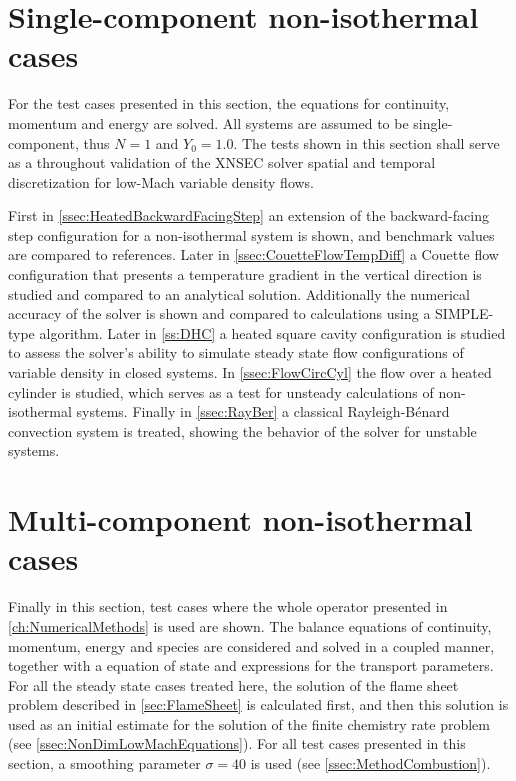 \section{Single-component non-isothermal cases} \label{sec:SinCompNonIsothermCase}
For the test cases presented in this section, the equations for continuity, momentum and energy are solved. All systems are assumed to be single-component, thus $N = 1$ and $Y_0 = 1.0$. 
The tests shown in this section shall serve as a throughout validation of the XNSEC solver spatial and temporal discretization for low-Mach variable density flows. 

First in \cref{ssec:HeatedBackwardFacingStep} an extension of the backward-facing step configuration for a non-isothermal system is shown, and benchmark values are compared to references. Later in \cref{ssec:CouetteFlowTempDiff} a Couette flow configuration that presents a temperature gradient in the vertical direction is studied and compared to an analytical solution. Additionally the numerical accuracy of the solver is shown and compared to calculations using a SIMPLE-type algorithm. Later in \cref{ss:DHC} a heated square cavity configuration is studied to assess the solver's ability to simulate steady state flow configurations of variable density in closed systems. In \cref{ssec:FlowCircCyl} the flow over a heated cylinder is studied, which serves as a test for unsteady calculations of non-isothermal systems. Finally in \cref{ssec:RayBer} a classical Rayleigh-Bénard convection system is treated, showing the behavior of the solver for unstable systems.





\section{Multi-component non-isothermal cases}\label{sec:MultCompNonIsothermCase}
Finally in this section, test cases where the whole operator presented in \cref{ch:NumericalMethods} is used are shown. The balance equations of continuity, momentum, energy and species are considered and solved in a coupled manner, together with a equation of state and expressions for the transport parameters. For all the steady state cases treated here, the solution of the flame sheet problem described in \cref{sec:FlameSheet} is calculated first, and then this solution is used as an initial estimate for the solution of the finite chemistry rate problem (see \cref{ssec:NonDimLowMachEquations}). For all test cases presented in this section, a smoothing parameter $\sigma = 40$ is used (see \cref{ssec:MethodCombustion}). 


